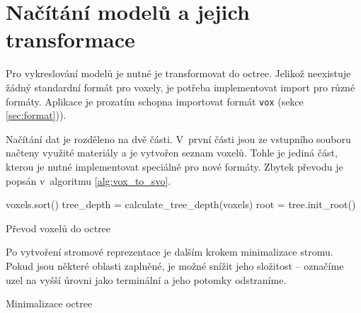 \section{Načítání modelů a jejich transformace} \label{sec:voxel_conversion}
Pro vykreslování modelů je nutné je transformovat do octree. Jelikož neexistuje žádný standardní formát pro voxely, je potřeba implementovat import pro různé formáty. Aplikace je prozatím schopna importovat formát \texttt{vox} (sekce \ref{sec:format})).

Načítání dat je rozděleno na dvě části. V~první části jsou ze vstupního souboru načteny využité materiály a je vytvořen seznam voxelů. Tohle je jediná část, kterou je nutné implementovat speciálně pro nové formáty. Zbytek převodu je popsán v~algoritmu \ref{alg:vox_to_svo}.


\begin{center}
	\begin{czechalgorithm}[H] \label{alg:vox_to_svo}
		voxels.sort()\;
		tree\_depth = calculate\_tree\_depth(voxels)\;
		root = tree.init\_root()\;
		\caption{Převod voxelů do octree}
	\end{czechalgorithm}
\end{center}

Po vytvoření stromové reprezentace je dalším krokem minimalizace stromu. Pokud jsou některé oblasti zaplněné, je možné snížit jeho složitost -- označíme uzel na vyšší úrovni jako terminální a jeho potomky odstraníme.

\begin{center}
	\begin{czechalgorithm}[H] \label{alg:minimize_svo}


		\caption{Minimalizace octree}
	\end{czechalgorithm}
\end{center}

